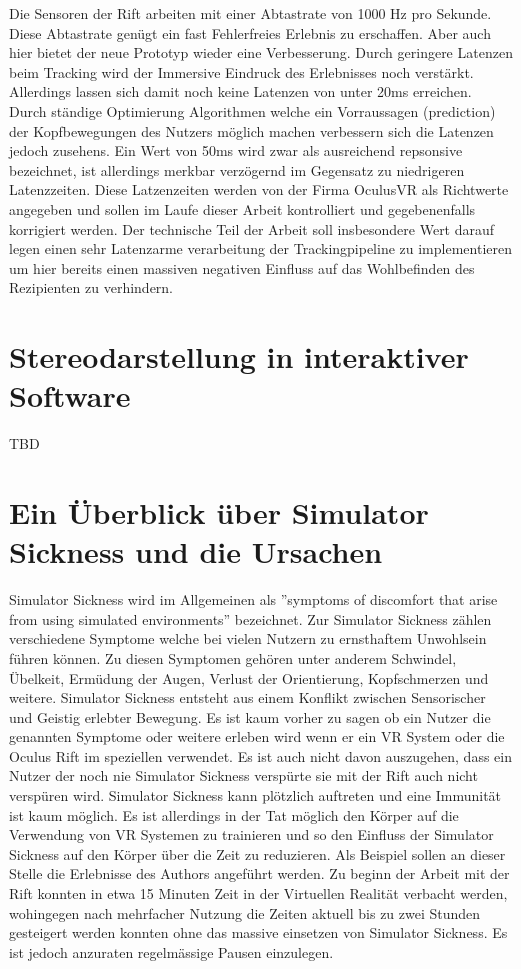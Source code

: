 \documentclass[pagesize, paper=a4, fontsize=12pt,titlepage=true, headings=small, headnosepline, abstractoff, liststotoc, nochapterprefix, plainheadsepline]{scrreprt}
\begin{document}
Die Sensoren der Rift arbeiten mit einer Abtastrate von 1000 Hz pro Sekunde. Diese Abtastrate genügt ein fast Fehlerfreies Erlebnis zu erschaffen. Aber auch hier bietet der neue Prototyp wieder eine Verbesserung. Durch geringere Latenzen beim Tracking wird der Immersive Eindruck des Erlebnisses noch verstärkt. Allerdings lassen sich damit noch keine Latenzen von unter 20ms erreichen. Durch ständige Optimierung Algorithmen welche ein Vorraussagen (prediction) der Kopfbewegungen des Nutzers möglich machen verbessern sich die Latenzen jedoch zusehens. Ein Wert von 50ms wird zwar als ausreichend repsonsive bezeichnet, ist allerdings merkbar verzögernd im Gegensatz zu niedrigeren Latenzzeiten. Diese Latzenzeiten werden von der Firma OculusVR als Richtwerte angegeben und sollen im Laufe dieser Arbeit kontrolliert und gegebenenfalls korrigiert werden. Der technische Teil der Arbeit soll insbesondere Wert darauf legen einen sehr Latenzarme verarbeitung der Trackingpipeline zu implementieren um hier bereits einen massiven negativen Einfluss auf das Wohlbefinden des Rezipienten zu verhindern.

\section{Stereodarstellung in interaktiver Software}
TBD

\section{Ein Überblick über Simulator Sickness und die Ursachen}
Simulator Sickness wird im Allgemeinen als ''symptoms of discomfort that arise from using simulated environments'' bezeichnet.
Zur Simulator Sickness zählen verschiedene Symptome welche bei vielen Nutzern zu ernsthaftem Unwohlsein führen können. Zu diesen Symptomen gehören unter anderem Schwindel, Übelkeit, Ermüdung der Augen, Verlust der Orientierung, Kopfschmerzen und weitere. Simulator Sickness entsteht aus einem Konflikt zwischen Sensorischer und Geistig erlebter Bewegung. Es ist kaum vorher zu sagen ob ein Nutzer die genannten Symptome oder weitere erleben wird wenn er ein VR System oder die Oculus Rift im speziellen verwendet. Es ist auch nicht davon auszugehen, dass ein Nutzer der noch nie Simulator Sickness verspürte sie mit der Rift auch nicht verspüren wird. Simulator Sickness kann plötzlich auftreten und eine Immunität ist kaum möglich. Es ist allerdings in der Tat möglich den Körper auf die Verwendung von VR Systemen zu trainieren und so den Einfluss der Simulator Sickness auf den Körper über die Zeit zu reduzieren. Als Beispiel sollen an dieser Stelle die Erlebnisse des Authors angeführt werden. Zu beginn der Arbeit mit der Rift konnten in etwa 15 Minuten Zeit in der Virtuellen Realität verbacht werden, wohingegen nach mehrfacher Nutzung die Zeiten aktuell bis zu zwei Stunden gesteigert werden konnten ohne das massive  einsetzen von Simulator Sickness. Es ist jedoch anzuraten regelmässige Pausen einzulegen.
\end{document}
